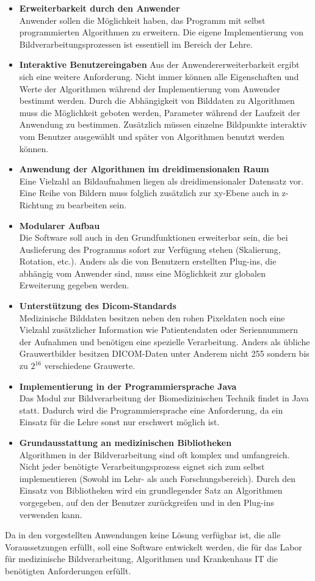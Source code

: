 \begin{itemize}
\item \textbf{Erweiterbarkeit durch den Anwender} \\
	  Anwender sollen die Möglichkeit haben, das Programm mit selbst programmierten Algorithmen zu erweitern. Die eigene Implementierung von Bildverarbeitungsprozessen ist essentiell im Bereich der Lehre.
	  
\item \textbf{Interaktive Benutzereingaben}
	  Aus der Anwendererweiterbarkeit ergibt sich eine weitere Anforderung. Nicht immer können alle Eigenschaften und Werte der Algorithmen während der Implementierung vom Anwender bestimmt werden. Durch die Abhängigkeit von Bilddaten zu Algorithmen muss die Möglichkeit geboten werden, Parameter während der Laufzeit der Anwendung zu bestimmen. Zusätzlich müssen einzelne Bildpunkte interaktiv vom Benutzer ausgewählt und später von Algorithmen benutzt werden können.

\item \textbf{Anwendung der Algorithmen im dreidimensionalen Raum}\\
	  Eine Vielzahl an Bildaufnahmen liegen als dreidimensionaler Datensatz vor. Eine Reihe von Bildern muss folglich zusätzlich zur xy-Ebene auch in z-Richtung zu bearbeiten sein.

\item \textbf{Modularer Aufbau} \\
	  Die Software soll auch in den Grundfunktionen erweiterbar sein, die bei Auslieferung des Programms sofort zur Verfügung stehen (Skalierung, Rotation, etc.). Anders als die von Benutzern erstellten Plug-ins, die abhängig vom Anwender sind, muss eine Möglichkeit zur globalen Erweiterung gegeben werden.

\item \textbf{Unterstützung des Dicom-Standards}\\
	  Medizinische Bilddaten besitzen neben den rohen Pixeldaten noch eine Vielzahl zusätzlicher Information wie Patientendaten oder Seriennummern der Aufnahmen und benötigen eine spezielle Verarbeitung. Anders als übliche Grauwertbilder besitzen DICOM-Daten unter Anderem nicht 255 sondern bis zu $2^{16}$ verschiedene Grauwerte.

\item \textbf{Implementierung in der Programmiersprache Java}\\
	  Das Modul zur Bildverarbeitung der Biomedizinischen Technik findet in Java statt. Dadurch wird die Programmiersprache eine Anforderung, da ein Einsatz für die Lehre sonst nur erschwert möglich ist.

\item \textbf{Grundausstattung an medizinischen Bibliotheken}\\
	  Algorithmen in der Bildverarbeitung sind oft komplex und umfangreich. Nicht jeder benötigte Verarbeitungsprozess eignet sich zum selbst implementieren (Sowohl im Lehr- als auch Forschungsbereich). Durch den Einsatz von Bibliotheken wird ein grundlegender Satz an Algorithmen vorgegeben, auf den der Benutzer zurückgreifen und in den Plug-ins verwenden kann.
\end{itemize}

Da in den vorgestellten Anwendungen keine Lösung verfügbar ist, die alle Voraussetzungen erfüllt, soll eine Software entwickelt werden, die für das Labor für medizinische Bildverarbeitung, Algorithmen und Krankenhaus IT die benötigten Anforderungen erfüllt.